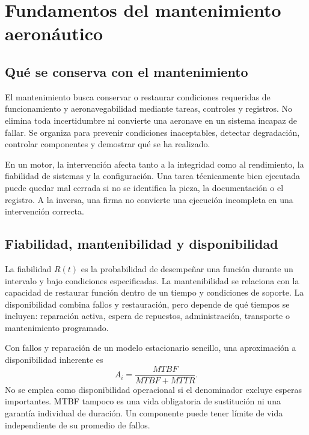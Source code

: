 \chapter{Fundamentos del mantenimiento aeronáutico}\label{ch:12}
\section{Qué se conserva con el mantenimiento}
El mantenimiento busca conservar o restaurar condiciones requeridas de funcionamiento y aeronavegabilidad mediante tareas, controles y registros. No elimina toda incertidumbre ni convierte una aeronave en un sistema incapaz de fallar. Se organiza para prevenir condiciones inaceptables, detectar degradación, controlar componentes y demostrar qué se ha realizado.

En un motor, la intervención afecta tanto a la integridad como al rendimiento, la fiabilidad de sistemas y la configuración. Una tarea técnicamente bien ejecutada puede quedar mal cerrada si no se identifica la pieza, la documentación o el registro. A la inversa, una firma no convierte una ejecución incompleta en una intervención correcta.
\section{Fiabilidad, mantenibilidad y disponibilidad}
La fiabilidad $R(t)$ es la probabilidad de desempeñar una función durante un intervalo y bajo condiciones especificadas. La mantenibilidad se relaciona con la capacidad de restaurar función dentro de un tiempo y condiciones de soporte. La disponibilidad combina fallos y restauración, pero depende de qué tiempos se incluyen: reparación activa, espera de repuestos, administración, transporte o mantenimiento programado.

Con fallos y reparación de un modelo estacionario sencillo, una aproximación a disponibilidad inherente es
\begin{equation}A_i=\frac{MTBF}{MTBF+MTTR}.\label{eq:disponibilidad}\end{equation}
No se emplea como disponibilidad operacional si el denominador excluye esperas importantes. MTBF tampoco es una vida obligatoria de sustitución ni una garantía individual de duración. Un componente puede tener límite de vida independiente de su promedio de fallos.
